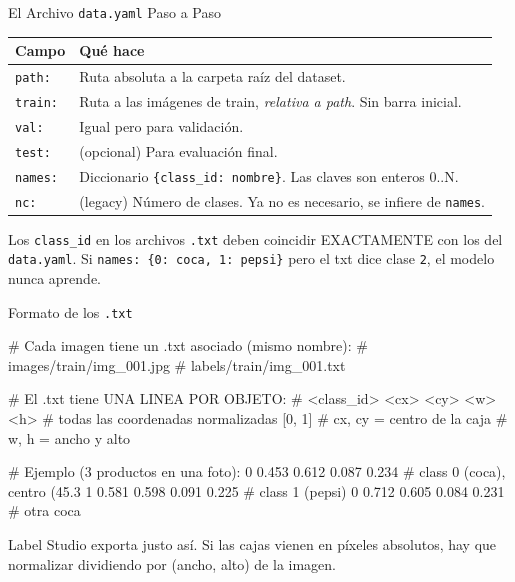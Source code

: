 \documentclass[aspectratio=169, 11pt]{beamer}
\begin{document}
\begin{frame}[shrink]{El Archivo \texttt{data.yaml} Paso a Paso}
  \vspace{6pt}
  {\footnotesize
  \begin{tabular}{@{}p{2.5cm} p{9.5cm}@{}}
    \toprule
    \textbf{Campo} & \textbf{Qu\'e hace} \\
    \midrule
    \rowcolor{arcaGray}
    \texttt{path:}
    & Ruta absoluta a la carpeta ra\'iz del dataset. \\
    \texttt{train:}
    & Ruta a las im\'agenes de train, \emph{relativa a path}. Sin barra inicial. \\
    \rowcolor{arcaGray}
    \texttt{val:}
    & Igual pero para validaci\'on. \\
    \texttt{test:}
    & (opcional) Para evaluaci\'on final. \\
    \rowcolor{arcaGray}
    \texttt{names:}
    & Diccionario \texttt{\{class\_id: nombre\}}. Las claves son enteros 0..N. \\
    \texttt{nc:}
    & (legacy) N\'umero de clases. Ya no es necesario, se infiere de \texttt{names}. \\
    \bottomrule
  \end{tabular}
  }

  \vspace{10pt}
  \begin{tcolorbox}[colback=arcaRed!8, colframe=arcaRed, boxrule=0.5pt,
    arc=2pt, left=6pt, right=6pt, top=4pt, bottom=4pt]
    {\scriptsize\color{arcaDark}
    \faExclamationTriangle\hspace{4pt} Los \texttt{class\_id} en los archivos
    \texttt{.txt} deben coincidir EXACTAMENTE con los del \texttt{data.yaml}.
    Si \texttt{names: \{0: coca, 1: pepsi\}} pero el txt dice clase \texttt{2},
    el modelo nunca aprende.}
  \end{tcolorbox}
\end{frame}

\begin{frame}{Formato de los \texttt{.txt}}
  \vspace{-4pt}
  \begin{pyblock}
# Cada imagen tiene un .txt asociado (mismo nombre):
#   images/train/img_001.jpg
#   labels/train/img_001.txt

# El .txt tiene UNA LINEA POR OBJETO:
# <class_id> <cx> <cy> <w> <h>
# todas las coordenadas normalizadas [0, 1]
# cx, cy = centro de la caja
# w, h   = ancho y alto

# Ejemplo (3 productos en una foto):
0 0.453 0.612 0.087 0.234     # class 0 (coca), centro (45.3%
1 0.581 0.598 0.091 0.225     # class 1 (pepsi)
0 0.712 0.605 0.084 0.231     # otra coca
  \end{pyblock}

  \vspace{4pt}
  {\scriptsize\color{textMuted}
    \faLightbulb\hspace{4pt} Label Studio exporta justo as\'i.
    Si las cajas vienen en p\'ixeles absolutos, hay que normalizar
    dividiendo por (ancho, alto) de la imagen.}
\end{frame}
\end{document}
